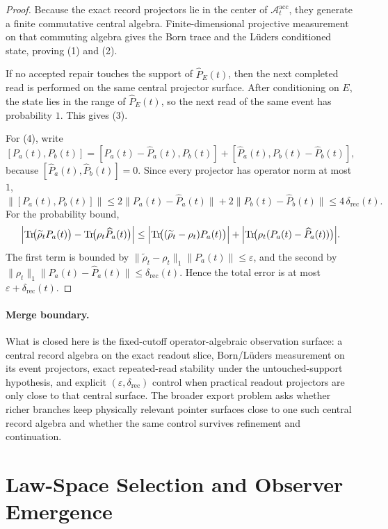\documentclass[11pt]{article}
\theoremstyle{remark}
\theoremstyle{plain}
\begin{document}
\begin{proof}
Because the exact record projectors lie in the center of \(\mathcal A_t^{\mathrm{acc}}\), they
generate a finite commutative central algebra. Finite-dimensional projective measurement on that
commuting algebra gives the Born trace and the L\"uders conditioned state, proving (1) and (2).

If no accepted repair touches the support of \(\widehat P_E(t)\), then the next completed read is
performed on the same central projector surface. After conditioning on \(E\), the state lies in
the range of \(\widehat P_E(t)\), so the next read of the same event has probability \(1\). This
gives (3).

For (4), write
\[
[P_a(t),P_b(t)]
=
[P_a(t)-\widehat P_a(t),P_b(t)]
+
[\widehat P_a(t),P_b(t)-\widehat P_b(t)],
\]
because \([\widehat P_a(t),\widehat P_b(t)]=0\). Since every projector has operator norm at most
\(1\),
\[
\|[P_a(t),P_b(t)]\|
\le
2\|P_a(t)-\widehat P_a(t)\|
+
2\|P_b(t)-\widehat P_b(t)\|
\le
4\,\delta_{\mathrm{rec}}(t).
\]
For the probability bound,
\[
\Bigl|
\operatorname{Tr}\!\bigl(\widetilde\rho_t P_a(t)\bigr)
-
\operatorname{Tr}\!\bigl(\rho_t \widehat P_a(t)\bigr)
\Bigr|
\le
\Bigl|\operatorname{Tr}\!\bigl((\widetilde\rho_t-\rho_t)P_a(t)\bigr)\Bigr|
+
\Bigl|\operatorname{Tr}\!\bigl(\rho_t(P_a(t)-\widehat P_a(t))\bigr)\Bigr|.
\]
The first term is bounded by \(\|\widetilde\rho_t-\rho_t\|_1\|P_a(t)\|\le \varepsilon\), and the
second by \(\|\rho_t\|_1\|P_a(t)-\widehat P_a(t)\|\le \delta_{\mathrm{rec}}(t)\). Hence the total
error is at most \(\varepsilon+\delta_{\mathrm{rec}}(t)\).
\end{proof}

\paragraph{Merge boundary.}
What is closed here is the fixed-cutoff operator-algebraic observation surface: a central record
algebra on the exact readout slice, Born/L\"uders measurement on its event projectors, exact
repeated-read stability under the untouched-support hypothesis, and explicit
\((\varepsilon,\delta_{\mathrm{rec}})\) control when practical readout projectors are only close
to that central surface. The broader export problem asks whether richer branches keep physically
relevant pointer surfaces close to one such central record algebra and whether the same control
survives refinement and continuation.


\section{Law-Space Selection and Observer Emergence}
\end{document}
